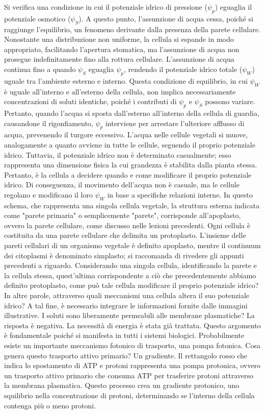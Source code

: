 \documentclass[11pt, a4paper]{article}
\begin{document}
\begin{spacing}{1}
Si verifica una condizione in cui il potenziale idrico di pressione ($\psi_p$) eguaglia il potenziale osmotico ($\psi_S$). A questo punto, l'assunzione di acqua cessa, poiché si raggiunge l'equilibrio, un fenomeno derivante dalla presenza della parete cellulare. Nonostante una distribuzione non uniforme, la cellula si espande in modo appropriato, facilitando l'apertura stomatica, ma l'assunzione di acqua non prosegue indefinitamente fino alla rottura cellulare. L'assunzione di acqua continua fino a quando $\psi_S$ eguaglia $\psi_p$, rendendo il potenziale idrico totale ($\psi_W$) uguale tra l'ambiente esterno e interno. Questa condizione di equilibrio, in cui $\psi_W$ è uguale all'interno e all'esterno della cellula, non implica necessariamente concentrazioni di soluti identiche, poiché i contributi di $\psi_p$ e $\psi_S$ possono variare. Pertanto, quando l'acqua si sposta dall'esterno all'interno della cellula di guardia, causandone il rigonfiamento, $\psi_p$ interviene per arrestare l'ulteriore afflusso di acqua, prevenendo il turgore eccessivo. 
L'acqua nelle cellule vegetali si muove, analogamente a quanto avviene in tutte le cellule, seguendo il proprio potenziale idrico. Tuttavia, il potenziale idrico non è determinato casualmente; esso rappresenta una dimensione fisica la cui grandezza è stabilita dalla pianta stessa. Pertanto, è la cellula a decidere quando e come modificare il proprio potenziale idrico. Di conseguenza, il movimento dell'acqua non è casuale, ma le cellule regolano e modificano il loro $\psi_W$ in base a specifiche relazioni interne.
In questo schema, che rappresenta una singola cellula vegetale, la struttura esterna indicata come "parete primaria" o semplicemente "parete", corrisponde all'apoplasto, ovvero la parete cellulare, come discusso nelle lezioni precedenti.
Ogni cellula è costituita da una parete cellulare che delimita un protoplasto. L'insieme delle pareti cellulari di un organismo vegetale è definito apoplasto, mentre il continuum dei citoplasmi è denominato simplasto; si raccomanda di rivedere gli appunti precedenti a riguardo. Considerando una singola cellula, identificando la parete e la cellula stessa, quest'ultima corrispondente a ciò che precedentemente abbiamo definito protoplasto, come può tale cellula modificare il proprio potenziale idrico? In altre parole, attraverso quali meccanismi una cellula altera il suo potenziale idrico? A tal fine, è necessario integrare le informazioni fornite dalle immagini illustrative. I soluti sono liberamente permeabili alle membrane plasmatiche? La risposta è negativa.
La necessità di energia è stata già trattata. Questo argomento è fondamentale poiché si manifesta in tutti i sistemi biologici. Probabilmente esiste un importante meccanismo fotonico di trasporto, una pompa fotonica. Cosa genera questo trasporto attivo primario? Un gradiente. Il rettangolo rosso che indica lo spostamento di ATP e protoni rappresenta una pompa protonica, ovvero un trasporto attivo primario che consuma ATP per trasferire protoni attraverso la membrana plasmatica. Questo processo crea un gradiente protonico, uno squilibrio nella concentrazione di protoni, determinando se l'interno della cellula contenga più o meno protoni.

\end{spacing}
\end{document}
